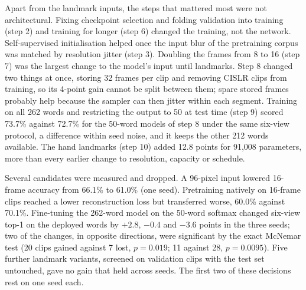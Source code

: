 \documentclass[pdflatex,sn-mathphys-num,onecolumn]{sn-jnl}
\theoremstyle{thmstyleone}%
\begin{document}
Apart from the landmark inputs, the steps that mattered most were not architectural. Fixing checkpoint selection and folding validation into training (step 2) and training for longer (step 6) changed the training, not the network. Self-supervised initialisation helped once the input blur of the pretraining corpus was matched by resolution jitter (step 3). Doubling the frames from 8 to 16 (step 7) was the largest change to the model's input until landmarks. Step 8 changed two things at once, storing 32 frames per clip and removing CISLR clips from training, so its 4-point gain cannot be split between them; spare stored frames probably help because the sampler can then jitter within each segment. Training on all 262 words and restricting the output to 50 at test time (step 9) scored 73.7\% against 72.7\% for the 50-word models of step 8 under the same six-view protocol, a difference within seed noise, and it keeps the other 212 words available. The hand landmarks (step 10) added 12.8 points for 91,008 parameters, more than every earlier change to resolution, capacity or schedule.

Several candidates were measured and dropped. A 96-pixel input lowered 16-frame accuracy from 66.1\% to 61.0\% (one seed). Pretraining natively on 16-frame clips reached a lower reconstruction loss but transferred worse, 60.0\% against 70.1\%. Fine-tuning the 262-word model on the 50-word softmax changed six-view top-1 on the deployed words by $+2.8$, $-0.4$ and $-3.6$ points in the three seeds; two of the changes, in opposite directions, were significant by the exact McNemar test (20 clips gained against 7 lost, $p=0.019$; 11 against 28, $p=0.0095$). Five further landmark variants, screened on validation clips with the test set untouched, gave no gain that held across seeds. The first two of these decisions rest on one seed each.


\end{document}
